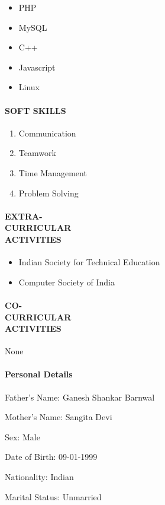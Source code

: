\documentclass{article}
\begin{document}
\begin{itemize}
	\item PHP
	\item MySQL
	\item C++
	\item Javascript
	\item Linux
\end{itemize}
\paragraph{\textbf{SOFT SKILLS }}

\begin{enumerate}
	\item Communication
	\item Teamwork
	\item Time Management
	\item Problem Solving
\end{enumerate}
\paragraph{\textbf{EXTRA-\\CURRICULAR\\ACTIVITIES }}

\begin{itemize}
	\item Indian Society for Technical Education
	\item Computer Society of India
\end{itemize}
\paragraph{\textbf{CO-\\CURRICULAR\\ACTIVITIES }}
None	
\paragraph{\textbf{Personal Details}}
	\begin{description}
		\item Father's Name: Ganesh Shankar Barnwal
		\item Mother's Name: Sangita Devi
		\item Sex: Male
		\item Date of Birth: 09-01-1999
		\item Nationality: Indian
		\item Marital Status: Unmarried
	\end{description}
\end{document}
